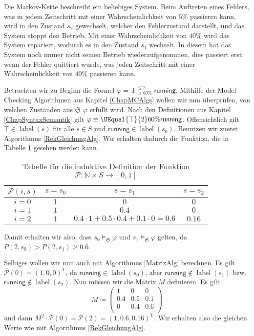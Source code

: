 Die Markov-Kette beschreibt ein beliebiges System. 
Beim Auftreten eines Fehlers, was in jedem Zeitschritt mit einer Wahrscheinlichkeit von $5\%$ passieren kann, wird in den Zustand $s_2$ gewechselt, welcher den Fehlerzustand darstellt, und das System stoppt den Betrieb. 
Mit einer Wahrscheinlichkeit von $40\%$ wird das System repariert, wodurch es in den Zustand $s_1$ wechselt.
In diesem hat das System noch immer nicht seinen Betrieb wiederaufgenommen, dies passiert erst, wenn der Fehler quittiert wurde, was jeden Zeitschritt mit einer Wahrscheinlichkeit von $40\%$ passieren kann.

Betrachten wir zu Beginn die Formel $\varphi = \operatorname{F}^{\leq 2}_{\geq 60\%} \mathsf{running}$. 
Mithilfe der Model-Checking Algorithmen aus Kapitel \ref{ChapMCAlgs} wollen wir nun überprüfen, von welchen Zuständen aus $\mathfrak{S}$ $\varphi$ erfüllt wird.
Nach den Definitionen aus Kapitel \ref{ChapSyntaxSemantik} gilt $\varphi\equiv \UEqual{\top}{2}{60\%}{\mathsf{running}}$. Offensichtlich gilt $\top\in \operatorname{label}(s)$ für alle $s\in S$ und $\mathsf{running}\in \operatorname{label}(s_0)$.
Benutzen wir zuerst Algorithmus \ref{RekGleichungAlg}. Wir erhalten dadurch die Funktion, die in Tabelle \ref{RekAlgBsp1} gesehen werden kann.

\begin{table}[h]
	\begin{center}
		\begin{tabular}{c|ccc}
			$\mathcal{P}(i,s)$ & $s=s_0$ & $s=s_1$ & $s=s_2$ \\
			\hline
			$i=0$ & $1$  & $0$ & $0$ \\
			$i=1$ & $1$  & $0.4$ & $0$ \\
			$i=2$ & $1$  & $0.4\cdot 1 + 0.5\cdot 0.4 + 0.1\cdot 0=0.6$ & $0.16$ \\
		\end{tabular}
		\caption{Tabelle für die induktive Definition der Funktion $\mathcal{P}:\mathbb{N}\times S \to [0,1]$}
		\label{RekAlgBsp1}
	\end{center}
\end{table}

Damit erhalten wir also, dass $s_0\models_\mathfrak{S}\varphi$ und $s_1\models_\mathfrak{S}\varphi$ gelten, da $P(2,s_0)>P(2,s_1) \geq 0.6$.

Selbiges wollen wir nun auch mit Algorithmus \ref{MatrixAlg} berechnen.
Es gilt $\overline{\mathcal{P}}(0)=(1,0,0)^{\operatorname{T}}$, da $\mathsf{running}\in\operatorname{label}(s_0)$, aber $\mathsf{running}\notin\operatorname{label}(s_1)$ bzw. $\mathsf{running}\notin\operatorname{label}(s_2)$. 
Nun müssen wir die Matrix $M$ definieren. Es gilt
$$
M\coloneqq \begin{pmatrix}
	1 & 0 & 0 \\
	0.4 & 0.5 & 0.1 \\
	0 & 0.4 & 0.6 \\
\end{pmatrix}
$$
und dann $M^2\cdot \overline{\mathcal{P}}(0) = \overline{\mathcal{P}}(2)= (1,0.6,0.16)^{\operatorname{T}}$. Wir erhalten also die gleichen Werte wie mit Algorithmus \ref{RekGleichungAlg}.

